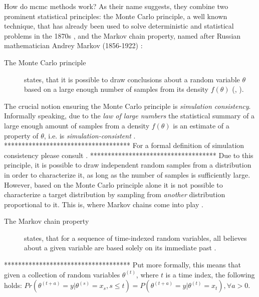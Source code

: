 \documentclass[11pt]{article}
\begin{document}
How do \gls{mcmc} methods work? As their name suggests, they combine two prominent statistical principles: the Monte Carlo principle, a well known technique, that has already been used to solve deterministic and statistical problems in the 1870s \parencite[cf.][140]{jackman2009},  and the Markov chain property, named after Russian mathematician Andrey Markov (1856-1922) \parencite[][171]{jackman2009}: 

\begin{description}
\item[The Monte Carlo principle] states, that it is possible to draw conclusions about a random variable $\theta$ based on a large enough number of samples from its density $f(\theta)$ (\cite[cf.][133]{jackman2009}, \cite[][1]{robert2016}). 
\end{description}
The crucial notion ensuring the Monte Carlo principle is \textit{simulation consistency}. Informally speaking, due to the \textit{law of large numbers} the statistical summary of a large enough amount of samples from a density $f(\theta)$ is an estimate of a property of $\theta$, i.e. is 
\textit{simulation-consistent} \parencite[][134]{jackman2009}. 
************************************
For a formal definition of simulation consistency please consult \textcite[][138]{jackman2009}.
************************************
Due to this principle, it is possible to draw independent random samples from a distribution in order to characterize it, as long as the number of samples is sufficiently large. However, based on the Monte Carlo principle alone it is not possible to characterize a target distribution by sampling from \textit{another} distribution proportional to it. This is, where Markov chains come into play \parencite[][1]{robert2016}.

\begin{description}
\item[The Markov chain property] states, that for a sequence of time-indexed random variables, all believes about a given variable are based solely on its immediate past \parencite[][172f]{jackman2009}.
\end{description} 

************************************
Put more formally, this means that given a collection of random variables $\theta^{(t)}$, where $t$ is a time index, the following holds: 
$Pr( \theta^{(t+a)} = y | \theta^{(s)} = x_s, s \leq t ) = P( \theta^{(t+a)} = y | \theta^{(t)} = x_t), \forall a > 0$. 
\end{document}
